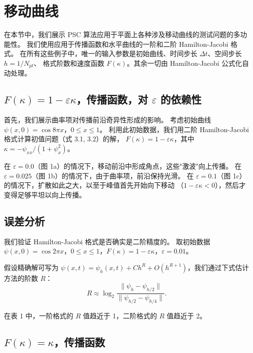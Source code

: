 \documentclass[11pt,a4paper]{article}
\begin{document}
\section{移动曲线}
\label{sec:curves}

在本节中，我们展示 PSC 算法应用于平面上各种涉及移动曲线的测试问题的多功能性。
我们使用应用于传播函数和水平曲线的一阶和二阶 Hamilton-Jacobi 格式。
在所有这些例子中，唯一的输入参数是初始曲线、时间步长 $\Delta t$、空间步长 $h = 1/N_{pt}$、
格式阶数和速度函数 $F(\kappa)$。其余一切由 Hamilton-Jacobi 公式化自动处理。

\subsection{$F(\kappa) = 1 - \varepsilon\kappa$，传播函数，对 $\varepsilon$ 的依赖性}

首先，我们展示曲率项对传播前沿奇异性形成的影响。
考虑初始曲线 $\psi(x,0) = \cos 8\pi x$，$0 \leq x \leq 1$。
利用此初始数据，我们用二阶 Hamilton-Jacobi 格式计算初值问题（式 3.1, 3.2）的解，
$F(\kappa) = 1 - \varepsilon\kappa$，其中 $\kappa = -\psi_{xx}/(1+\psi_x^2)$。

在 $\varepsilon = 0.0$（图 1a）的情况下，移动前沿中形成角点，这些"激波"向上传播。
在 $\varepsilon = 0.025$（图 1b）的情况下，由于曲率项，前沿保持光滑。
在 $\varepsilon = 0.1$（图 1c）的情况下，扩散如此之大，以至于峰值首先开始向下移动
（$1 - \varepsilon\kappa < 0$），然后才变得足够平坦以向上传播。

\subsection{误差分析}

我们验证 Hamilton-Jacobi 格式是否确实是二阶精度的。
取初始数据 $\psi(x,0) = \cos 2\pi x$，$0 \leq x \leq 1$，$F(\kappa) = 1 - \varepsilon\kappa$，$\varepsilon = 0.01$。

假设精确解可写为 $\psi(x,t) = \psi_h(x,t) + C h^R + O(h^{R+1})$，我们通过下式估计方法的阶数 $R$：
\begin{equation}
R \approx \log_2\frac{\|\psi_h - \psi_{h/2}\|}{\|\psi_{h/2} - \psi_{h/4}\|}.
\end{equation}

在表 1 中，一阶格式的 $R$ 值趋近于 1，二阶格式的 $R$ 值趋近于 2。

\subsection{$F(\kappa) = \kappa$，传播函数}
\end{document}
